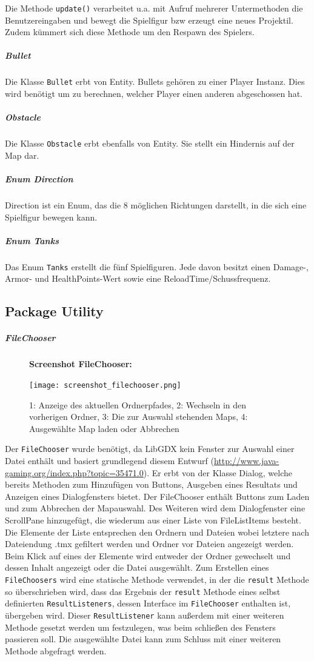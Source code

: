 \documentclass[a4paper]{scrreprt}
\def\code#1{\texttt{#1}}
\begin{document}
Die Methode \code{update()} verarbeitet u.a. mit Aufruf mehrerer Untermethoden die Benutzereingaben und bewegt die Spielfigur bzw erzeugt eine neues Projektil. Zudem kümmert sich diese Methode um den Respawn des Spielers.
\subparagraph{Bullet}
Die Klasse \code{Bullet} erbt von Entity. Bullets gehören zu einer Player Instanz. Dies wird benötigt um zu berechnen, welcher Player einen anderen abgeschossen hat.
\subparagraph{Obstacle}
Die Klasse \code{Obstacle} erbt ebenfalls von Entity. Sie stellt ein Hindernis auf der Map dar.
\subparagraph{Enum Direction}
Direction ist ein Enum, das die 8 möglichen Richtungen darstellt, in die sich eine Spielfigur bewegen kann.

\subparagraph{Enum Tanks}
Das Enum \code{Tanks} erstellt die fünf Spielfiguren. Jede davon besitzt einen Damage-, Armor- und HealthPoints-Wert sowie eine ReloadTime/Schussfrequenz. 

\newpage
\subsection{Package Utility}
\subparagraph{FileChooser}
\begin{figure}[H]
  \textbf{Screenshot FileChooser:}\par\medskip
  \centering
\texttt{[image: screenshot\_filechooser.png]}  
\caption{1: Anzeige des aktuellen Ordnerpfades, 2: Wechseln in den vorherigen Ordner, 3: Die zur Auswahl stehenden Maps, 4: Ausgewählte Map laden oder Abbrechen}
\end{figure}

Der \code{FileChooser} wurde benötigt, da LibGDX kein Fenster zur Auswahl einer Datei enthält und basiert grundlegend diesem Entwurf (\url{http://www.java-gaming.org/index.php?topic=35471.0}).
Er erbt von der Klasse Dialog, welche bereits Methoden zum Hinzufügen von Buttons, Ausgeben eines Resultats und Anzeigen eines Dialogfensters bietet. Der FileChooser enthält Buttons zum Laden und zum Abbrechen der Mapauswahl. Des Weiteren wird dem Dialogfenster eine ScrollPane hinzugefügt, die wiederum aus einer Liste von FileListItems besteht. Die Elemente der Liste entsprechen den Ordnern und Dateien wobei letztere nach Dateiendung .tmx gefiltert werden und Ordner vor Dateien angezeigt werden. Beim Klick auf eines der Elemente wird entweder der Ordner gewechselt und dessen Inhalt angezeigt oder die Datei ausgewählt. Zum Erstellen eines \code{FileChoosers} wird eine statische Methode verwendet, in der die \code{result} Methode so überschrieben wird, dass das Ergebnis der \code{result} Methode eines selbst definierten \code{ResultListeners}, dessen Interface im \code{FileChooser} enthalten ist, übergeben wird. Dieser \code{ResultListener} kann außerdem mit einer weiteren Methode gesetzt werden um festzulegen, was beim schließen des Fensters passieren soll. Die ausgewählte Datei kann zum Schluss mit einer weiteren Methode abgefragt werden.
\end{document}
